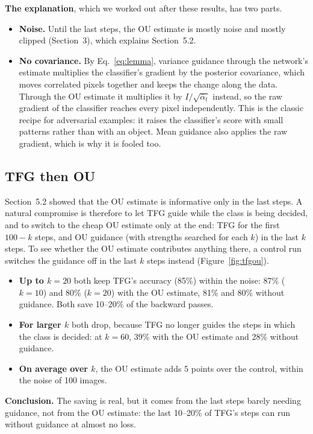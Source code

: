 \documentclass[11pt]{article}
\begin{document}
\textbf{The explanation}, which we worked out after these results, has two parts.
\begin{itemize}
  \item \textbf{Noise.} Until the last steps, the OU estimate is mostly noise and mostly clipped (Section~3), which
        explains Section~5.2.
  \item \textbf{No covariance.} By Eq.~\eqref{eq:lemma}, variance guidance through the network's estimate multiplies
        the classifier's gradient by the posterior covariance, which moves correlated pixels together and keeps the
        change along the data. Through the OU estimate it multiplies it by $I/\sqrt{\bar\alpha_t}$ instead, so the raw
        gradient of the classifier reaches every pixel independently. This is the classic recipe for adversarial
        examples: it raises the classifier's score with small patterns rather than with an object. Mean guidance also
        applies the raw gradient, which is why it is fooled too.
\end{itemize}

\subsection{TFG then OU}
Section~5.2 showed that the OU estimate is informative only in the last steps. A natural compromise is therefore to let
TFG guide while the class is being decided, and to switch to the cheap OU estimate only at the end: TFG for the first
$100-k$ steps, and OU guidance (with strengths searched for each $k$) in the last $k$ steps. To see whether the OU
estimate contributes anything there, a control run switches the guidance off in the last $k$ steps instead
(Figure~\ref{fig:tfgou}).
\begin{itemize}
  \item \textbf{Up to $k = 20$} both keep TFG's accuracy (85\%) within the noise: 87\% ($k = 10$) and 80\% ($k = 20$)
        with the OU estimate, 81\% and 80\% without guidance. Both save 10--20\% of the backward passes.
  \item \textbf{For larger $k$} both drop, because TFG no longer guides the steps in which the class is decided: at
        $k = 60$, 39\% with the OU estimate and 28\% without guidance.
  \item \textbf{On average over $k$}, the OU estimate adds 5 points over the control, within the noise of 100 images.
\end{itemize}
\textbf{Conclusion.} The saving is real, but it comes from the last steps barely needing guidance, not from the OU
estimate: the last 10--20\% of TFG's steps can run without guidance at almost no loss.
\end{document}

